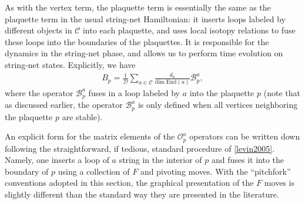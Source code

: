 \documentclass[12pt,a4paper]{article}
\newcommand{\mcb}{\mathcal{B}}
\newcommand{\mcd}{\mathcal{D}}
\newcommand{\mcc}{\mathcal{C}}
\newcommand{\mco}{\mathcal{O}}
\newcommand{\p}{\partial}
\begin{document}
As with the vertex term, the plaquette term is essentially the same as the plaquette term in the usual string-net Hamiltonian: it inserts loops labeled by different objects in $\mcc$ into each plaquette, and uses local isotopy relations to fuse these loops into the boundaries of the plaquettes. 
It is responsible for the dynamics in the string-net phase, and allows us to perform time evolution on string-net states.  
Explicitly, we have
\begin{align} \label{plaquette_term_defn}
B_p =\frac{1}{\mcd} \sum_{a \in \mcc} \frac{d_a}{\text{dim} \; \text{End}(a)} \mcb^a_p, %
\end{align}
where the operator $\mcb_p^a$ fuses in a loop labeled by $a$ into the plaquette $p$ (note that 
as discussed earlier, the operator $\mcb_p^a$ is only defined when all vertices neighboring the plaquette $p$ are stable).

An explicit form for the matrix elements of the $\mco_p^a$ operators can be written down following the straightforward, if tedious, standard procedure of \ref{levin2005}.
Namely, one inserts a loop of $a$ string in the interior of $p$ and fuses it into the boundary of $p$ using a
collection of $F$ and pivoting moves. 
With the ``pitchfork'' conventions adopted in this section, the graphical presentation of the $F$ moves is
slightly different than the standard way they are presented in the literature.
\end{document}
